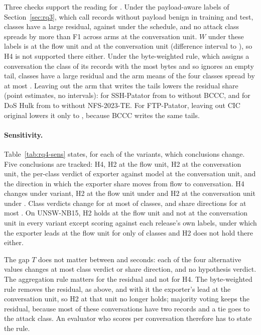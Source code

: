 Three checks support the reading for \cicids{}. Under the payload-aware labels of Section~\ref{sec:rq3}, which call records without payload benign in training and test, \RevPayLarge{} \cicids{} classes have a large residual, against \RevSchLarge{} under the schedule, and no attack class spreads by more than \RevPaySpreadMax{} F1 across arms at the conversation unit. $W$ under these labels is \RevPayWFlow{} at the flow unit and \RevPayWConv{} at the conversation unit (difference interval \RevPayWDiffLo{} to \RevPayWDiffHi{}), so H4 is not supported there either. Under the byte-weighted rule, which assigns a conversation the class of its records with the most bytes and so ignores an empty tail, \RQfourBytesLarge{} \cicids{} classes have a large residual and the arm means of the four classes spread by at most \RQfourBytesSpreadMax{}. Leaving out the arm that writes the tails lowers the residual share (point estimates, no intervals): for SSH-Patator from \RQfourSshShareConv{} to \RQfourLoaoSshBccc{} without BCCC, and for DoS Hulk from \RQfourHulkShareConv{} to \RQfourLoaoHulkTe{} without NFS-2023-TE. For FTP-Patator, leaving out CIC original lowers it only to \RQfourLoaoFtpOrig{}, because BCCC writes the same tails.

\paragraph{Sensitivity.} Table~\ref{tab:rq4-sens} states, for each of the \RQfourSensVariants{} \cicids{} variants, which conclusions change. Five conclusions are tracked: H4, H2 at the flow unit, H2 at the conversation unit, the per-class verdict of exporter against model at the conversation unit, and the direction in which the exporter share moves from flow to conversation. H4 changes under \RQfourSensChangedHfour{} variant, H2 at the flow unit under \RQfourSensChangedHtwoFlow{} and H2 at the conversation unit under \RQfourSensChangedHtwoConv{}. Class verdicts change for at most \RQfourSensKfourMax{} of \RQfourClassesOf{} classes, and share directions for at most \RQfourSensKfiveMax{}. On UNSW-NB15, H2 holds at the flow unit and not at the conversation unit in every variant except scoring against each release's own labels, under which the exporter leads at the flow unit for only \RQfourUnswOwnAbove{} of \RQfourUnswOwnElig{} classes and H2 does not hold there either.



The gap $T$ does not matter between \NsweepCicStableMin{} and  seconds: each of the four alternative values changes at most \RQfourSensTClassMax{} class verdict or share direction, and no hypothesis verdict. The aggregation rule matters for the residual and not for H4. The byte-weighted rule removes the \cicids{} residual, as above, and with it the exporter's lead at the conversation unit, so H2 at that unit no longer holds; majority voting keeps the residual, because most of these conversations have two records and a tie goes to the attack class. An evaluator who scores per conversation therefore has to state the rule.

